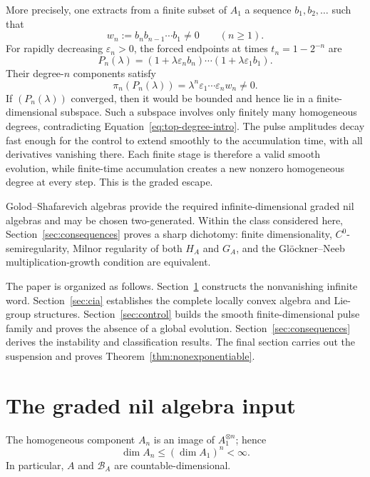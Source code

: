 \documentclass[11pt]{article}
\theoremstyle{remark}
\begin{document}
More precisely, one extracts from a finite subset of $A_1$ a sequence
$b_1,b_2,\ldots$ such that
\begin{equation}
  w_n:=b_nb_{n-1}\cdots b_1\neq0
  \qquad(n\geq1).
  \label{eq:word-intro}
\end{equation}
For rapidly decreasing $\varepsilon_n>0$, the forced endpoints at times
$t_n=1-2^{-n}$ are
\[
  P_n(\lambda)
  =(1+\lambda\varepsilon_nb_n)\cdots
   (1+\lambda\varepsilon_1b_1).
\]
Their degree-$n$ components satisfy
\begin{equation}
  \pi_n(P_n(\lambda))
  =\lambda^n\varepsilon_1\cdots\varepsilon_nw_n\neq0.
  \label{eq:top-degree-intro}
\end{equation}
If $(P_n(\lambda))$ converged, then it would be bounded and hence lie in
a finite-dimensional subspace.  Such a subspace involves only finitely many
homogeneous degrees, contradicting Equation~\eqref{eq:top-degree-intro}.
The pulse amplitudes decay fast enough for the control to extend smoothly to
the accumulation time, with all derivatives vanishing there.  Each finite
stage is therefore a valid smooth evolution, while finite-time accumulation
creates a new nonzero homogeneous degree at every step.  This is the graded
escape.

Golod--Shafarevich algebras provide the required infinite-dimensional graded
nil algebras and may be chosen two-generated.  Within the class considered
here, Section~\ref{sec:consequences} proves a sharp dichotomy: finite
dimensionality, $C^0$-semiregularity, Milnor regularity of both $H_A$ and
$G_A$, and the Gl\"ockner--Neeb multiplication-growth condition are
equivalent.

The paper is organized as follows.  Section~\ref{sec:algebra} constructs the
nonvanishing infinite word.  Section~\ref{sec:cia} establishes the complete
locally convex algebra and Lie-group structures.  Section~\ref{sec:control}
builds the smooth finite-dimensional pulse family and proves the absence of a
global evolution.  Section~\ref{sec:consequences} derives the instability and
classification results.  The final section carries out the suspension and
proves Theorem~\ref{thm:nonexponentiable}.





\section{The graded nil algebra input}
\label{sec:algebra}

The homogeneous component $A_n$ is an image of $A_1^{\otimes n}$; hence
\begin{equation}
  \dim A_n\leq(\dim A_1)^n<\infty.
  \label{eq:automatic-finite-dimensionality}
\end{equation}
In particular, $A$ and $\mathcal B_A$ are countable-dimensional.
\end{document}
